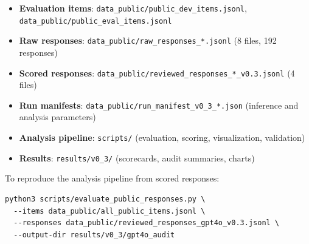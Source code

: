 \begin{itemize}[nosep,leftmargin=*]
  \item \textbf{Evaluation items}: \texttt{data\_public/public\_dev\_items.jsonl}, \texttt{data\_public/public\_eval\_items.jsonl}
  \item \textbf{Raw responses}: \texttt{data\_public/raw\_responses\_*.jsonl} (8 files, 192 responses)
  \item \textbf{Scored responses}: \texttt{data\_public/reviewed\_responses\_*\_v0.3.jsonl} (4 files)
  \item \textbf{Run manifests}: \texttt{data\_public/run\_manifest\_v0\_3\_*.json} (inference and analysis parameters)
  \item \textbf{Analysis pipeline}: \texttt{scripts/} (evaluation, scoring, visualization, validation)
  \item \textbf{Results}: \texttt{results/v0\_3/} (scorecards, audit summaries, charts)
\end{itemize}

To reproduce the analysis pipeline from scored responses:
\begin{verbatim}
python3 scripts/evaluate_public_responses.py \
  --items data_public/all_public_items.jsonl \
  --responses data_public/reviewed_responses_gpt4o_v0.3.jsonl \
  --output-dir results/v0_3/gpt4o_audit
\end{verbatim}
